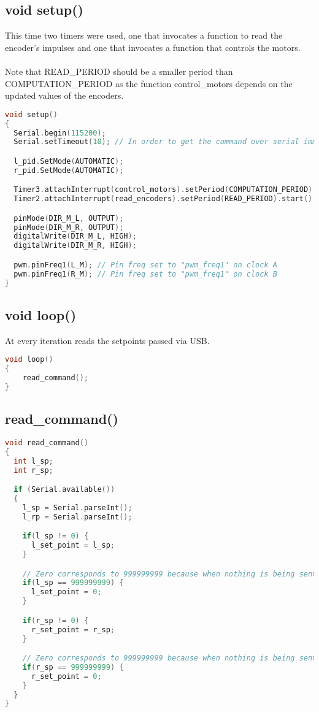 \subsection{void setup()}
This time two timers were used, one that invocates a function to read the encoder's impulses and one that invocates a function 
that controls the motors.
\\ \\
Note that READ\_PERIOD should be a smaller period than COMPUTATION\_PERIOD as the function control\_motors depends on the updated 
values of the encoders.

\begin{lstlisting}[language=C]
void setup()
{
  Serial.begin(115200);
  Serial.setTimeout(10); // In order to get the command over serial immediatly, waits only 10ms

  l_pid.SetMode(AUTOMATIC);
  r_pid.SetMode(AUTOMATIC);

  Timer3.attachInterrupt(control_motors).setPeriod(COMPUTATION_PERIOD).start();
  Timer2.attachInterrupt(read_encoders).setPeriod(READ_PERIOD).start();

  pinMode(DIR_M_L, OUTPUT);
  pinMode(DIR_M_R, OUTPUT);
  digitalWrite(DIR_M_L, HIGH);
  digitalWrite(DIR_M_R, HIGH);

  pwm.pinFreq1(L_M); // Pin freq set to "pwm_freq1" on clock A
  pwm.pinFreq1(R_M); // Pin freq set to "pwm_freq1" on clock B
}
\end{lstlisting}

\subsection{void loop()}
At every iteration reads the setpoints passed via USB.
\begin{lstlisting}[language=C]
void loop()
{
    read_command();
}
\end{lstlisting}

\subsection{read\_command()}

\begin{lstlisting}[language=C]
void read_command()
{
  int l_sp;
  int r_sp;

  if (Serial.available())
  {
    l_sp = Serial.parseInt();
    l_rp = Serial.parseInt();

    if(l_sp != 0) {
      l_set_point = l_sp;
    }

    // Zero corresponds to 999999999 because when nothing is being sent the serial keeps reading 0
    if(l_sp == 999999999) {
      l_set_point = 0;
    }

    if(r_sp != 0) {
      r_set_point = r_sp;
    }

    // Zero corresponds to 999999999 because when nothing is being sent the serial keeps reading 0
    if(r_sp == 999999999) {
      r_set_point = 0;
    }
  }
}
\end{lstlisting}

